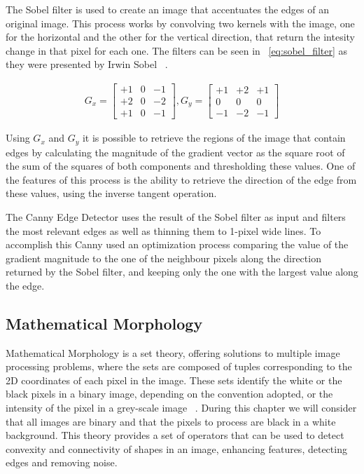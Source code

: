 The Sobel filter is used to create an image that accentuates the edges of an original image. This process works by convolving two kernels with the image, one for the horizontal and the other for the vertical direction, that return the intesity change in that pixel for each one. The filters can be seen in ~\ref{eq:sobel_filter} as they were presented by Irwin Sobel ~\cite{sobel_isotropic_1989}.

\begin{eqnarray}
\label{eq:sobel_filter}
G_{x} =
\begin{bmatrix}
+1 & 0 & -1\\ 
+2 & 0 & -2\\ 
+1 & 0 & -1
\end{bmatrix} , G_{y} = \begin{bmatrix}
+1 & +2 & +1\\ 
0 & 0 & 0\\ 
-1 & -2 & -1
\end{bmatrix}
\end{eqnarray}

Using $G_{x}$ and $G_{y}$ it is possible to retrieve the regions of the image that contain edges by calculating the magnitude of the gradient vector as the square root of the sum of the squares of both components and thresholding these values. One of the features of this process is the ability to retrieve the direction of the edge from these values, using the inverse tangent operation.

The Canny Edge Detector uses the result of the Sobel filter as input and filters the most relevant edges as well as thinning them to 1-pixel wide lines. To accomplish this Canny used an optimization process comparing the value of the gradient magnitude to the one of the neighbour pixels along the direction returned by the Sobel filter, and keeping only the one with the largest value along the edge.

\subsection{Mathematical Morphology}

Mathematical Morphology is a set theory, offering solutions to multiple image processing problems, where the sets are composed of tuples corresponding to the 2D coordinates of each pixel in the image. These sets identify the white or the black pixels in a binary image, depending on the convention adopted, or the intensity of the pixel in a grey-scale image ~\cite{dougherty_introduction_1992}. During this chapter we will consider that all images are binary and that the pixels to process are black in a white background. This theory provides a set of operators that can be used to detect convexity and connectivity of shapes in an image, enhancing features, detecting edges and removing noise. 

